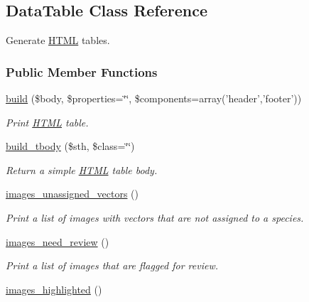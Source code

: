 \hypertarget{classDataTable}{\subsection{Data\-Table Class Reference}
\label{classDataTable}
}


Generate \hyperlink{classHTML}{H\-T\-M\-L} tables.  


\subsubsection*{Public Member Functions}
\begin{DoxyCompactItemize}
\item 
\hyperlink{classDataTable_afcaf77a1a8158f843f3881208f0cdac4}{build} (\$body, \$properties=\char`\"{}\char`\"{}, \$components=array('header','footer'))
\begin{DoxyCompactList}\small\item\em Print \hyperlink{classHTML}{H\-T\-M\-L} table. \end{DoxyCompactList}\item 
\hyperlink{classDataTable_a96fdd1a56f76ac72e7a7ecce82a06a1d}{build\-\_\-tbody} (\$sth, \$class=\char`\"{}\char`\"{})
\begin{DoxyCompactList}\small\item\em Return a simple \hyperlink{classHTML}{H\-T\-M\-L} table body. \end{DoxyCompactList}\item 
\hypertarget{classDataTable_a747f48562b9f9ad3cb35bbda429ae7d0}{\hyperlink{classDataTable_a747f48562b9f9ad3cb35bbda429ae7d0}{images\-\_\-unassigned\-\_\-vectors} ()}\label{classDataTable_a747f48562b9f9ad3cb35bbda429ae7d0}

\begin{DoxyCompactList}\small\item\em Print a list of images with vectors that are not assigned to a species. \end{DoxyCompactList}\item 
\hypertarget{classDataTable_acdc88b8674e9af875d9fdbbb6e36bda3}{\hyperlink{classDataTable_acdc88b8674e9af875d9fdbbb6e36bda3}{images\-\_\-need\-\_\-review} ()}\label{classDataTable_acdc88b8674e9af875d9fdbbb6e36bda3}

\begin{DoxyCompactList}\small\item\em Print a list of images that are flagged for review. \end{DoxyCompactList}\item 
\hypertarget{classDataTable_aae1eed20159db0c809e26ab41aee3a18}{\hyperlink{classDataTable_aae1eed20159db0c809e26ab41aee3a18}{images\-\_\-highlighted} ()}\label{classDataTable_aae1eed20159db0c809e26ab41aee3a18}


\end{DoxyCompactItemize}
